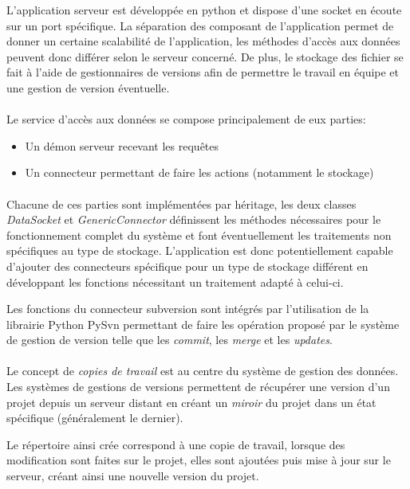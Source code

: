\documentclass[a4paper,12pt]{article}
\begin{document}
L'application serveur est développée en python et dispose d'une socket en écoute sur un port spécifique.
La séparation des composant de l'application permet de donner un certaine scalabilité de l'application, les méthodes d'accès aux données peuvent donc différer selon le serveur concerné.
De plus, le stockage des fichier se fait à l'aide de gestionnaires de versions afin de permettre le travail en équipe et une gestion de version éventuelle.

\paragraph{}
Le service d'accès aux données se compose principalement de eux parties:

\begin{itemize}
\item Un démon serveur recevant les requêtes
\item Un connecteur permettant de faire les actions (notamment le stockage)
\end{itemize}

\paragraph{}
Chacune de ces parties sont implémentées par héritage, les deux classes \emph{DataSocket} et \emph{GenericConnector} définissent les méthodes nécessaires pour le fonctionnement complet du système et font éventuellement les traitements non spécifiques au type de stockage.
L'application est donc potentiellement capable d'ajouter des connecteurs spécifique pour un type de stockage différent en développant les fonctions nécessitant un traitement adapté à celui-ci.

Les fonctions du connecteur subversion sont intégrés par l'utilisation de la librairie Python PySvn permettant de faire les opération proposé par le système de gestion de version telle que les \emph{commit}, les \emph{merge} et les \emph{updates}.

\paragraph{}
Le concept de \emph{copies de travail} est au centre du système de gestion des données.
Les systèmes de gestions de versions permettent de récupérer une version d'un projet depuis un serveur distant en créant un \emph{miroir} du projet dans un état spécifique (généralement le dernier).

Le répertoire ainsi crée correspond à une copie de travail, lorsque des modification sont faites sur le projet, elles sont ajoutées puis mise à jour sur le serveur, créant ainsi une nouvelle version du projet.
\end{document}
